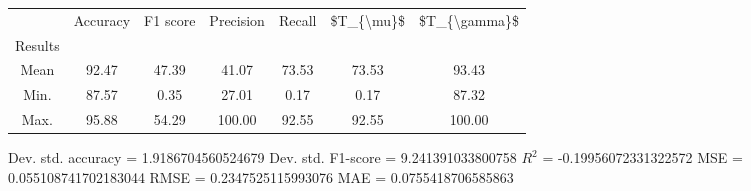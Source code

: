 \begin{tabular}{|c|c|c|c|c|c|c|}
\toprule
{} &  Accuracy &  F1 score &  Precision &  Recall &  \$T\_\{\textbackslash mu\}\$ &  \$T\_\{\textbackslash gamma\}\$ \\
Results &           &           &            &         &            &               \\
\hline
Mean    &     92.47 &     47.39 &      41.07 &   73.53 &      73.53 &         93.43 \\
Min.    &     87.57 &      0.35 &      27.01 &    0.17 &       0.17 &         87.32 \\
Max.    &     95.88 &     54.29 &     100.00 &   92.55 &      92.55 &        100.00 \\
\bottomrule
\end{tabular}

 Dev. std. accuracy = 1.9186704560524679
 Dev. std. F1-score = 9.241391033800758
 $R^2$ = -0.19956072331322572
 MSE = 0.055108741702183044
 RMSE = 0.2347525115993076
 MAE = 0.0755418706585863